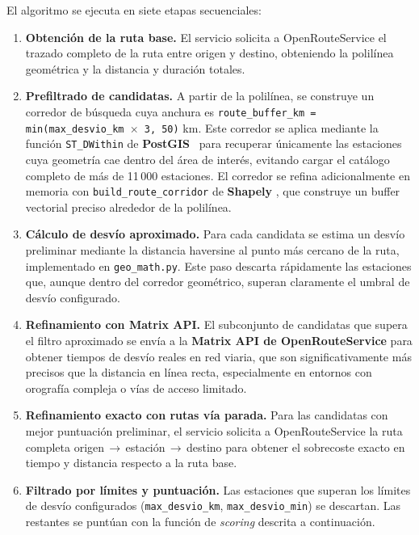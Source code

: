 El algoritmo se ejecuta en siete etapas secuenciales:

\begin{enumerate}
  \item \textbf{Obtención de la ruta base.} El servicio solicita a OpenRouteService el
        trazado completo de la ruta entre origen y destino, obteniendo la polilínea geométrica
        y la distancia y duración totales.

  \item \textbf{Prefiltrado de candidatas.} A partir de la polilínea, se construye un
        corredor de búsqueda cuya anchura es \texttt{route\_buffer\_km = min(max\_desvio\_km
          $\times$ 3,\ 50)} km. Este corredor se aplica mediante la función
        \texttt{ST\_DWithin} de \textbf{PostGIS}~\cite{postgis} para recuperar únicamente las
        estaciones cuya geometría cae dentro del área de interés, evitando cargar el catálogo
        completo de más de 11\,000 estaciones. El corredor se refina adicionalmente en memoria
        con \texttt{build\_route\_corridor} de \textbf{Shapely} \cite{shapely}, que construye un buffer
        vectorial preciso alrededor de la polilínea.

  \item \textbf{Cálculo de desvío aproximado.} Para cada candidata se estima un desvío
        preliminar mediante la distancia haversine al punto más cercano de la ruta, implementado
        en \texttt{geo\_math.py}. Este paso descarta rápidamente las estaciones que, aunque
        dentro del corredor geométrico, superan claramente el umbral de desvío configurado.

  \item \textbf{Refinamiento con Matrix API.} El subconjunto de candidatas que supera el
        filtro aproximado se envía a la \textbf{Matrix API de OpenRouteService} \cite{openrouteservice_matrix_api} para obtener
        tiempos de desvío reales en red viaria, que son significativamente más precisos que la
        distancia en línea recta, especialmente en entornos con orografía compleja o vías de
        acceso limitado.

  \item \textbf{Refinamiento exacto con rutas vía parada.} Para las candidatas con mejor
        puntuación preliminar, el servicio solicita a OpenRouteService la ruta completa
        origen\,$\rightarrow$\,estación\,$\rightarrow$\,destino para obtener el sobrecoste
        exacto en tiempo y distancia respecto a la ruta base.

  \item \textbf{Filtrado por límites y puntuación.} Las estaciones que superan los límites
        de desvío configurados (\texttt{max\_desvio\_km}, \texttt{max\_desvio\_min}) se
        descartan. Las restantes se puntúan con la función de \textit{scoring} descrita a
        continuación.
\end{enumerate}

